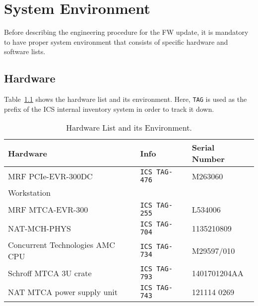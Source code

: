 \documentclass[11pt
  , a4paper
  , article
  , oneside
  , showtrims
]{memoir}
\begin{document}
\clearpage

\chapter{System Environment}
Before describing the engineering procedure for the FW update, it is mandatory to have proper system environment that consists of specific hardware and software lists.


\section{Hardware}
Table~\ref{table:hwlist} shows the hardware list and its environment. Here, \texttt{TAG} is used as the prefix of the ICS internal inventory system in order to track it down.
\begin{table}[!hb]
  \centering
  \begin{tabular}{l|l|l}
    \toprule
    Hardware                        & Info                                        & Serial Number \\\midrule
    MRF PCIe-EVR-300DC              & \texttt{ICS TAG-476}                        & M263060       \\\midrule
    Workstation                     &                                             &               \\\midrule
    MRF MTCA-EVR-300                & \texttt{ICS TAG-255}                        & L534006       \\\midrule
    NAT-MCH-PHYS                    & \texttt{ICS TAG-704}                        & 1135210809    \\\midrule
    Concurrent Technologies AMC CPU & \texttt{ICS TAG-734}                        & M29597/010    \\\midrule
    Schroff MTCA 3U crate           & \texttt{ICS TAG-793}                        & 1401701204AA  \\\midrule
    NAT MTCA power supply unit      & \texttt{ICS TAG-743}                        & 121114 0269   \\\bottomrule
  \end{tabular}
  \caption[]{Hardware List and its Environment.}
  \label{table:hwlist}
\end{table}

\end{document}
